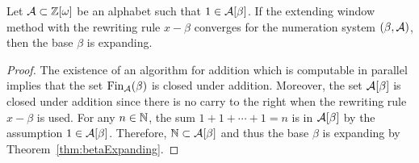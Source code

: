 \begin{thm}
Let $\mathcal{A}\subset \mathbb{Z}[\omega]$ be an alphabet such that $1\in \mathcal{A}[\beta]$. If the extending window method with the rewriting rule $x-\beta$ converges for the numeration system $(\beta, \mathcal{A})$, then the base $\beta$ is expanding. 
\end{thm}
\begin{proof}
The existence of an algorithm for addition which is computable in parallel implies that the set $\text{Fin}_{\mathcal{A}}(\beta)$ is closed under addition. Moreover, the set $\mathcal{A}[\beta]$ is closed under addition since there is no carry to the right when the rewriting rule $x-\beta$ is used. For any $n\in\mathbb{N}$, the sum $1+1+\cdots +1=n$ is in $\mathcal{A}[\beta]$ by the assumption $1\in \mathcal{A}[\beta]$. Therefore, $\mathbb{N}\subset \mathcal{A}[\beta]$ and thus the base $\beta$ is expanding by Theorem~\ref{thm:betaExpanding}.
\end{proof}
